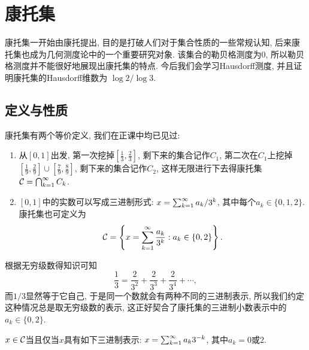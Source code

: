 \section{康托集}
康托集一开始由康托提出, 目的是打破人们对于集合性质的一些常规认知, 
后来康托集也成为几何测度论中的一个重要研究对象. 该集合的勒贝格测度为$0$, 所以勒贝格测度并不能很好地展现出康托集的特点. 今后我们会学习Hausdorff测度, 并且证明康托集的Hausdorff维数为 $\log 2 / \log 3$.
\subsection{定义与性质}
康托集有两个等价定义, 我们在正课中均已见过:
\begin{enumerate}
    \item 从$[0,1]$出发, 第一次挖掉$[\frac{1}{3}, \frac{2}{3}]$, 
    剩下来的集合记作$C_1$,
    第二次在$C_1$上挖掉$[\frac{1}{9}, \frac{2}{9}] \cup [\frac{7}{9}, \frac{8}{9}]$, 剩下来的集合记作$C_2$, 这样无限进行下去得康托集$\mathcal{C} = \bigcap_{k=1}^{\infty}C_k$.
    \item $[0,1]$中的实数可以写成三进制形式: $x = \sum_{k=1}^{\infty}a_k/3^k$, 其中每个$a_k \in \{0,1,2\}$. 康托集也可定义为
    $$\mathcal{C} = \left\{x=\sum_{k=1}^{\infty}\frac{a_k}{3^k}: a_k \in \{0,2\}\right\}.$$
\end{enumerate}
\begin{remark}
    根据无穷级数得知识可知
    $$\frac{1}{3} = \frac{2}{3^2}+\frac{2}{3^3}+\frac{2}{3^4}+\cdots,$$
    而$1/3$显然等于它自己, 于是同一个数就会有两种不同的三进制表示, 所以我们约定这种情况总是取无穷级数的表示, 这正好契合了康托集的三进制小数表示中的$a_k \in \{0,2\}$. 
\end{remark}
\begin{exercise}
    $x \in \mathcal{C}$当且仅当$x$具有如下三进制表示: $x = \sum_{k=1}^{\infty}a_k 3^{-k}$, 其中$a_k = 0$或$2$. 
\end{exercise}
